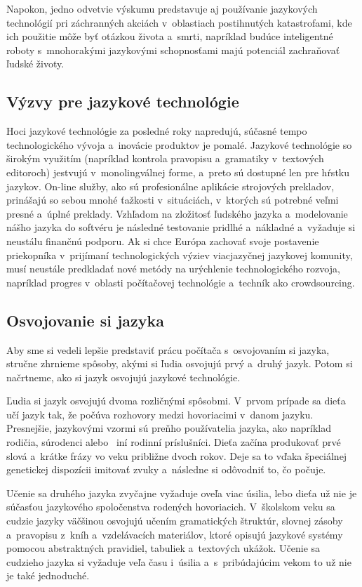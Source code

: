 \begin{multicols}{2}
Napokon, jedno odvetvie výskumu predstavuje aj používanie jazykových technológií pri záchranných akciách v~oblastiach postihnutých katastrofami, kde ich použitie môže byť otázkou života a~smrti, napríklad budúce inteligentné roboty s~mnohorakými jazykovými schopnosťami majú potenciál zachraňovať ľudské životy.

\subsection{Výzvy pre jazykové technológie}
Hoci jazykové technológie za posledné roky napredujú, súčasné tempo technologického vývoja a~inovácie produktov je pomalé. Jazykové technológie so širokým využitím (napríklad kontrola pravopisu a~gramatiky v~textových editoroch) jestvujú v~monolingválnej forme, a~preto sú dostupné len pre hŕstku jazykov. On-line služby, ako sú profesionálne aplikácie strojových prekladov, prinášajú so sebou mnohé ťažkosti v~situáciách, v~ktorých sú potrebné veľmi presné a~úplné preklady. Vzhľadom na zložitosť ľudského jazyka a~modelovanie nášho jazyka do softvéru je následné testovanie pridlhé a~nákladné a~vyžaduje si neustálu finančnú podporu. Ak si chce Európa zachovať svoje postavenie priekopníka v~prijímaní technologických výziev viacjazyčnej jazykovej komunity, musí neustále predkladať nové metódy na urýchlenie technologického rozvoja, napríklad progres v~oblasti počítačovej technológie a~techník ako crowdsourcing.


\subsection{Osvojovanie si jazyka}
Aby sme si vedeli lepšie predstaviť prácu počítača s~osvojovaním si jazyka, stručne zhrnieme spôsoby, akými si ľudia osvojujú prvý a~druhý jazyk. Potom si načrtneme, ako si jazyk osvojujú jazykové technológie. 

Ľudia si jazyk osvojujú dvoma rozličnými spôsobmi. V~prvom prípade sa dieťa učí jazyk tak, že počúva rozhovory medzi hovoriacimi v~danom jazyku. Presnejšie, jazykovými vzormi sú preňho používatelia jazyka, ako napríklad rodičia, súrodenci alebo ~iní rodinní príslušníci. Dieťa začína produkovať prvé slová a~krátke frázy vo veku približne dvoch rokov. Deje sa to vďaka špeciálnej genetickej dispozícii imitovať zvuky a~následne si odôvodniť to, čo počuje.

Učenie sa druhého jazyka zvyčajne vyžaduje oveľa viac úsilia, lebo dieťa už nie je súčasťou jazykového spoločenstva rodených hovoriacich. V~školskom veku sa cudzie jazyky väčšinou osvojujú učením gramatických štruktúr, slovnej zásoby a~pravopisu z~kníh a~vzdelávacích materiálov, ktoré opisujú jazykové systémy pomocou abstraktných pravidiel, tabuliek a~textových ukážok. Učenie sa cudzieho jazyka si vyžaduje veľa času i~úsilia a~s~pribúdajúcim vekom to už nie je také jednoduché.


\end{multicols}
